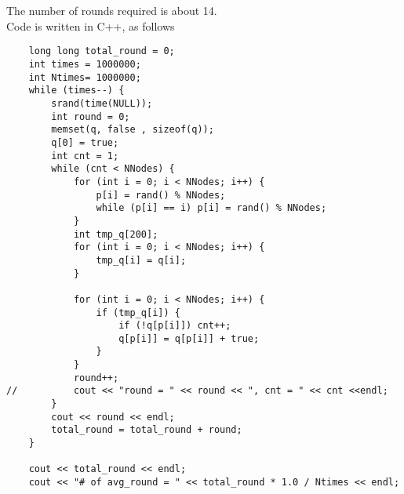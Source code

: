 \documentclass{article}
\begin{document}
	\section{}
	The number of rounds required is about 14.\\
	Code is written in C++, as follows
	\begin{lstlisting}
	long long total_round = 0;
	int times = 1000000;
	int Ntimes= 1000000;
	while (times--) {
		srand(time(NULL));
		int round = 0;
		memset(q, false , sizeof(q));
		q[0] = true;
		int cnt = 1;
		while (cnt < NNodes) {
			for (int i = 0; i < NNodes; i++) {
				p[i] = rand() % NNodes;
				while (p[i] == i) p[i] = rand() % NNodes;
			}
			int tmp_q[200];
			for (int i = 0; i < NNodes; i++) {
				tmp_q[i] = q[i];
			}

			for (int i = 0; i < NNodes; i++) {
				if (tmp_q[i]) {
					if (!q[p[i]]) cnt++;
					q[p[i]] = q[p[i]] + true;
				}
			}
			round++;
//			cout << "round = " << round << ", cnt = " << cnt <<endl; 
		}
		cout << round << endl;
		total_round = total_round + round;
	}

	cout << total_round << endl;
	cout << "# of avg_round = " << total_round * 1.0 / Ntimes << endl;
	\end{lstlisting}


	\section{}
\end{document}
